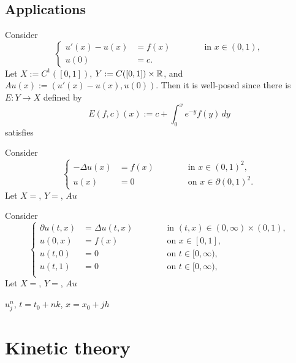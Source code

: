 \documentclass[a4paper]{article}
\begin{document}
\subsection{Applications}
\begin{ex}
Consider
\[\left\{\begin{alignedat}{2}
u'(x)-u(x)&=f(x) &\qquad&\text{ in }x\in(0,1),\\
u(0)&=c. &&
\end{alignedat}\right.\]
Let $X:=C^1([0,1])$, $Y:=C([0,1])\times\mathbb{R}$, and $Au(x):=(u'(x)-u(x),u(0))$.
Then it is well-posed since there is $E:Y\to X$ defined by
\[E(f,c)(x):=c+\int_0^xe^{-y}f(y)\,dy\]
satisfies
\end{ex}

\begin{ex}
Consider
\[\left\{\begin{alignedat}{2}
-\Delta u(x)&=f(x) &\qquad&\text{ in }x\in(0,1)^2,\\
u(x)&=0 &&\text{ on }x\in\partial(0,1)^2.
\end{alignedat}\right.\]
Let $X=$, $Y=$, $Au$
\end{ex}

\begin{ex}
Consider
\[\left\{\begin{alignedat}{2}
\partial u(t,x)&=\Delta u(t,x) &\qquad&\text{ in }(t,x)\in(0,\infty)\times(0,1),\\
u(0,x)&=f(x) &&\text{ on }x\in[0,1],\\
u(t,0)&=0 &&\text{ on }t\in[0,\infty),\\
u(t,1)&=0 &&\text{ on }t\in[0,\infty),\\
\end{alignedat}\right.\]
Let $X=$, $Y=$, $Au$
\end{ex}


$u_j^n$, $t=t_0+nk$, $x=x_0+jh$




\newpage
\section{Kinetic theory}
\end{document}
